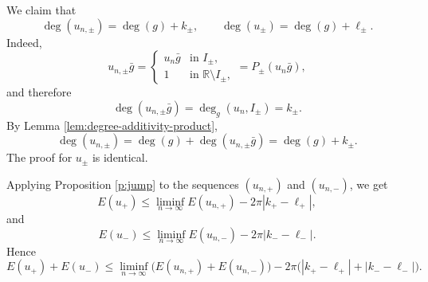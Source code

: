 \documentclass[12pt, a4paper]{article}
\renewcommand{\(}{\left(}
\renewcommand{\)}{\right)}
\begin{document}
We claim that
\[
        \deg(u_{n,\pm})=\deg(g)+k_\pm,
        \qquad
        \deg(u_\pm)=\deg(g)+\ell_\pm.
\]
Indeed,
\[
        u_{n,\pm}\bar g
        =
        \begin{cases}
        u_n\bar g & \text{in } I_\pm,\\
        1 & \text{in } \mathbb R\setminus I_\pm,
        \end{cases}
        =
        P_\pm(u_n\bar g),
\]
and therefore
\[
        \deg(u_{n,\pm}\bar g)=\deg_g(u_n,I_\pm)=k_\pm.
\]
By Lemma \ref{lem:degree-additivity-product},
\[
        \deg(u_{n,\pm})
        =
        \deg(g)+\deg(u_{n,\pm}\bar g)
        =
        \deg(g)+k_\pm.
\]
The proof for $u_\pm$ is identical.

Applying Proposition \ref{p:jump} to the sequences
$(u_{n,+})$ and $(u_{n,-})$, we get
\[
        E(u_+)
        \le
        \liminf_{n\to\infty}E(u_{n,+})
        -
        2\pi |k_+-\ell_+|,
\]
and
\[
        E(u_-)
        \le
        \liminf_{n\to\infty}E(u_{n,-})
        -
        2\pi |k_- -\ell_-|.
\]
Hence
\[
        E(u_+)+E(u_-)
        \le
        \liminf_{n\to\infty}
        \bigl(E(u_{n,+})+E(u_{n,-})\bigr)
        -
        2\pi\bigl(|k_+-\ell_+|+|k_- - \ell_-|\bigr).
\]
\end{document}
